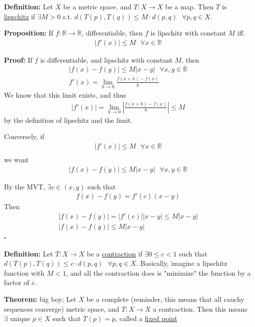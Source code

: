 \documentclass{article}
\newcommand*{\qed}{\hfill$\square$}%
\newcommand*{\txt}[1]{\text{ #1 }}%
\newcommand*{\fora}{\txt{}\forall}%
\newcommand*{\rr}{\mathbb{R}}%
\begin{document}
\textbf{Definition:} Let $X$ be a metric space, and $T:X\to X$ be a map. Then $T$ is \underline{lipschitz} if $\exists M>0$ s.t. $d(T(p),T(q))\leq M\cdot d(p,q)\fora p,q\in X$.

\textbf{Proposition:} If $f:\rr\to\rr$, differentiable, then $f$ is lipschitz with constant $M$ iff. \begin{align*}
    |f'(x)|\leq M\fora x\in \rr
\end{align*}

\textbf{Proof:} If $f$ is differentiable, and lipschitz with constant $M$, then \begin{align*}
    |f(x)-f(y)|\leq M|x-y|\fora x,y\in \rr\\
    f'(x)=\lim_{h\to 0}\frac{f(x+h)-f(x)}{h}
\end{align*}
We know that this limit exists, and thus \begin{align*}
    |f'(x)|=\lim_{h\to 0}|\frac{f(x+h)-f(x)}{h}|\leq M
\end{align*} by the definition of lipschitz and the limit.

Conversely, if \begin{align*}
    |f'(x)|\leq M\fora x\in \rr\\
\end{align*} we want \begin{align*}
    |f(x)-f(y)|\leq M|x-y|\fora x,y\in \rr
\end{align*}

By the MVT, $\exists c\in (x,y)$ such that \begin{align*}
    f(x)-f(y)=f'(c)(x-y)
\end{align*} Then \begin{align*}
    |f(x)-f(y)|=|f'(c)||x-y|\leq M|x-y|\\
    |f(x)-f(y)|\leq M|x-y|
\end{align*} \qed

\textbf{Definition:} Let $T:X\to X$ be a \underline{contraction} if $\exists 0\leq c<1$ such that $d(T(p),T(q))\leq c\cdot d(p,q)\fora p,q\in X$. Basically, imagine a lipschitz function with $M<1$, and all the contraction does is "minimize" the function by a factor of $c$.

\textbf{Theorem:} big boy; Let $X$ be a complete (reminder, this means that all cauchy sequences converge) metric space, and $T:X\to X$ a contraction. Then this means $\exists$ unique $p\in X$ such that $T(p)=p$, called a \underline{fixed point}
\end{document}
